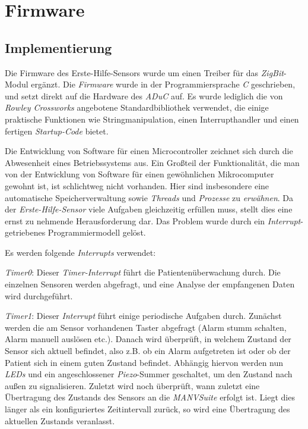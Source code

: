 \section{Firmware}
\subsection{Implementierung}
Die Firmware des Erste-Hilfe-Sensors wurde um einen Treiber für das \emph{ZigBit}-Modul ergänzt. Die \emph{Firmware}
wurde in der Programmiersprache \emph{C} geschrieben, und setzt direkt auf die Hardware des \emph{ADuC} auf. Es wurde 
lediglich die von \emph{Rowley Crossworks} angebotene Standardbibliothek verwendet, die einige praktische Funktionen wie
Stringmanipulation, einen Interrupthandler und einen fertigen \emph{Startup-Code} bietet.

Die Entwicklung von Software für einen Microcontroller zeichnet sich durch die Abwesenheit eines Betriebssystems 
aus. Ein Großteil der Funktionalität, die man von der Entwicklung von Software für einen gewöhnlichen Mikrocomputer 
gewohnt ist, ist schlichtweg nicht vorhanden. Hier sind insbesondere eine automatische Speicherverwaltung sowie
\emph{Threads} und \emph{Prozesse} zu \emph{erwähnen}. Da der \emph{Erste-Hilfe-Sensor} viele Aufgaben gleichzeitig 
erfüllen muss, stellt dies eine ernst zu nehmende Herausforderung dar. Das Problem wurde durch ein
\emph{Interrupt}-getriebenes Programmiermodell gelöst.

Es werden folgende \emph{Interrupts} verwendet:

\emph{Timer0}: Dieser \emph{Timer-Interrupt} führt die Patientenüberwachung durch. Die einzelnen Sensoren werden abgefragt,
und eine Analyse der empfangenen Daten wird durchgeführt.

\emph{Timer1}: Dieser \emph{Interrupt} führt einige periodische Aufgaben durch. Zunächst werden die am Sensor vorhandenen
Taster abgefragt (Alarm stumm schalten, Alarm manuell auslösen etc.). Danach wird überprüft, in welchem Zustand
der Sensor sich aktuell befindet, also z.B. ob ein Alarm aufgetreten ist oder ob der Patient sich in einem
guten Zustand befindet. Abhängig hiervon werden nun \emph{LEDs} und ein angeschlossener \emph{Piezo}-Summer geschaltet,
um den Zustand nach außen zu signalisieren. Zuletzt wird noch überprüft, wann zuletzt eine Übertragung
des Zustands des Sensors an die \emph{MANVSuite} erfolgt ist. Liegt dies länger als ein konfiguriertes Zeitintervall
zurück, so wird eine Übertragung des aktuellen Zustands veranlasst.


